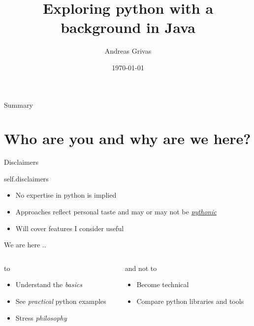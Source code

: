 \documentclass{bredelebeamer}
\title[Exploring python]{Exploring python with a background in Java}
\author{Andreas Grivas\inst{1}}
\institute[Harokopeio University of Athens]
{
  \inst{1}%
  Informatics and Telematics\\
  Harokopeio University of Athens
  }
\date{\today}
\begin{document}
\begin{frame}
  \titlepage
\end{frame}





\begin{frame}{Summary}
  \tableofcontents
\end{frame}




\section{Who are you and why are we here?}

\begin{frame}{Disclaimers}
  \begin{block}{self.disclaimers}
  \begin{itemize}
  \item No expertise in python is implied
  \item Approaches reflect personal taste and may or may not be \href{https://github.com/python/cpython/blob/c7688b44387d116522ff53c0927169db45969f0e/Lib/this.py}{\emph{pythonic}}
  \item Will cover features I consider useful
  \end{itemize}
  \end{block}
\end{frame}

\begin{frame}{We are here ..}

\begin{columns}

\begin{column}{0.5\textwidth}

\begin{exampleblock}{to}
\begin{itemize}
\item Understand the \emph{basics}
\item See \emph{practical} python examples
\item Stress \emph{philosophy}
\end{itemize}
\end{exampleblock}

\end{column}

\begin{column}{0.5\textwidth}
\begin{alertblock}{and not to}
\begin{itemize}
\item Become technical
\item Compare python libraries and tools
\end{itemize}
\end{alertblock}
\end{column}

\end{columns}
\end{frame}
\end{document}
